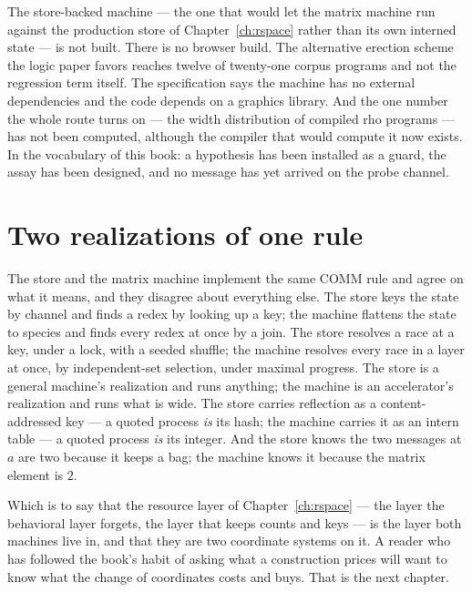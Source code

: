 \begin{remark}
\label{cb:rmk:nascent}
The store-backed machine --- the one that would let the matrix machine run against the
production store of Chapter~\ref{ch:rspace} rather than its own interned state --- is not
built. There is no browser build. The alternative erection scheme the logic paper favors
reaches twelve of twenty-one corpus programs and not the regression term itself. The
specification says the machine has no external dependencies and the code depends on a
graphics library. And the one number the whole route turns on --- the width distribution
of compiled rho programs --- has not been computed, although the compiler that would
compute it now exists. In the vocabulary of this book: a hypothesis has been installed as a
guard, the assay has been designed, and no message has yet arrived on the probe channel.
\end{remark}

\section{Two realizations of one rule}
\label{cb:sec:two}

The store and the matrix machine implement the same COMM rule and agree on what it means,
and they disagree about everything else. The store keys the state by channel and finds a
redex by looking up a key; the machine flattens the state to species and finds every
redex at once by a join. The store resolves a race at a key, under a lock, with a seeded
shuffle; the machine resolves every race in a layer at once, by independent-set selection,
under maximal progress. The store is a general machine's realization and runs anything;
the machine is an accelerator's realization and runs what is wide. The store carries
reflection as a content-addressed key --- a quoted process \emph{is} its hash; the machine
carries it as an intern table --- a quoted process \emph{is} its integer. And the store
knows the two messages at $a$ are two because it keeps a bag; the machine knows it because
the matrix element is $2$.

Which is to say that the resource layer of Chapter~\ref{ch:rspace} --- the layer the
behavioral layer forgets, the layer that keeps counts and keys --- is the layer both
machines live in, and that they are two coordinate systems on it. A reader who has
followed the book's habit of asking what a construction prices will want to know what the
change of coordinates costs and buys. That is the next chapter.

